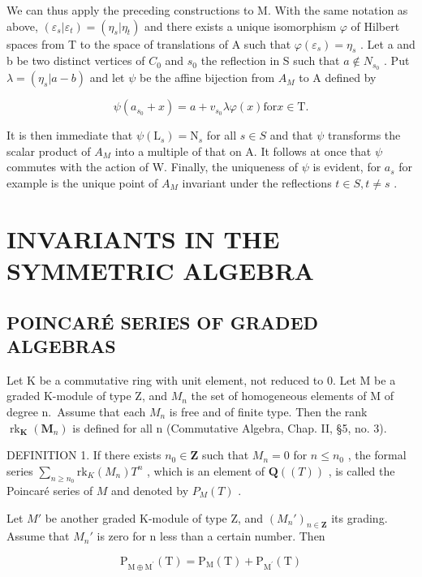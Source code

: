 We can thus apply the preceding constructions to M. With the same notation as above, \((\varepsilon_{s}|\varepsilon_{t}) = (\eta_{s}|\eta_{t})\) and there exists a unique isomorphism \(\varphi\) of Hilbert spaces from T to the space of translations of A such that \(\varphi(\varepsilon_{s}) = \eta_{s}\) . Let a and b be two distinct vertices of \(C_{0}\) and \(s_{0}\) the reflection in S such that \(a \notin N_{s_{0}}\) . Put \(\lambda = (\eta_{s}|a - b)\) and let \(\psi\) be the affine bijection from \(A_{M}\) to A defined by

\[
\psi \left(a _ {s _ {0}} + x\right) = a + v _ {s _ {0}} \lambda \varphi (x) \text {for} x \in \mathrm{T}.
\]

It is then immediate that \(\psi(\mathrm{L}_{s}) = \mathrm{N}_{s}\) for all \(s \in S\) and that \(\psi\) transforms the scalar product of \(A_{M}\) into a multiple of that on A. It follows at once that \(\psi\) commutes with the action of W. Finally, the uniqueness of \(\psi\) is evident, for \(a_{s}\) for example is the unique point of \(A_{M}\) invariant under the reflections \(t \in S, t \neq s\) .

\section{INVARIANTS IN THE SYMMETRIC ALGEBRA}

\subsection{POINCARÉ SERIES OF GRADED ALGEBRAS}

Let K be a commutative ring with unit element, not reduced to 0. Let M be a graded K-module of type Z, and \(M_{n}\) the set of homogeneous elements of M of degree n.~Assume that each \(M_{n}\) is free and of finite type. Then the rank \(\operatorname{rk}_{\mathbf{K}}(\mathbf{M}_{n})\) is defined for all n (Commutative Algebra, Chap. II, §5, no. 3).

DEFINITION 1. If there exists \(n_0 \in \mathbf{Z}\) such that \(M_n = 0\) for \(n \leqslant n_0\) , the formal series \(\sum_{n \geqslant n_0} \mathrm{rk}_K(M_n) T^n\) , which is an element of \(\mathbf{Q}((T))\) , is called the Poincaré series of \(M\) and denoted by \(P_M(T)\) .

Let \(M'\) be another graded K-module of type Z, and \((M_n')_{n \in \mathbf{Z}}\) its grading. Assume that \(M_n'\) is zero for n less than a certain number. Then

\[
\mathrm{P} _ {\mathrm{M} \oplus \mathrm{M} ^ {\prime}} (\mathrm{T}) = \mathrm{P} _ {\mathrm{M}} (\mathrm{T}) + \mathrm{P} _ {\mathrm{M} ^ {\prime}} (\mathrm{T})\tag{1}
\]

